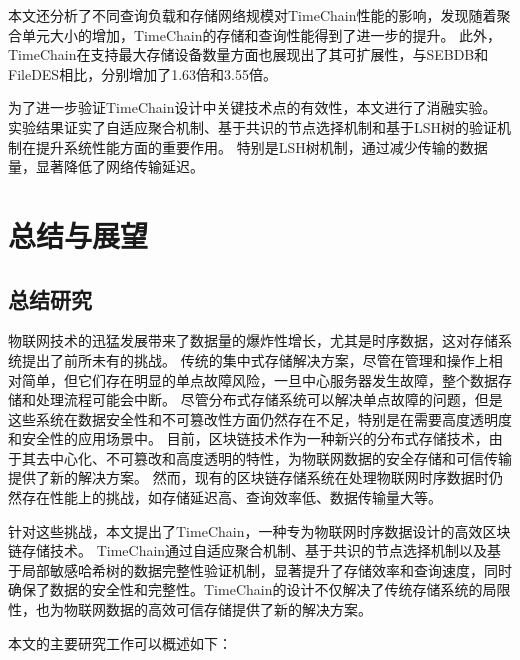 本文还分析了不同查询负载和存储网络规模对TimeChain性能的影响，发现随着聚合单元大小的增加，TimeChain的存储和查询性能得到了进一步的提升。
此外，TimeChain在支持最大存储设备数量方面也展现出了其可扩展性，与SEBDB和FileDES相比，分别增加了1.63倍和3.55倍。

为了进一步验证TimeChain设计中关键技术点的有效性，本文进行了消融实验。
实验结果证实了自适应聚合机制、基于共识的节点选择机制和基于LSH树的验证机制在提升系统性能方面的重要作用。
特别是LSH树机制，通过减少传输的数据量，显著降低了网络传输延迟。

\chapter{总结与展望}
\section{总结研究}
物联网技术的迅猛发展带来了数据量的爆炸性增长，尤其是时序数据，这对存储系统提出了前所未有的挑战。
传统的集中式存储解决方案，尽管在管理和操作上相对简单，但它们存在明显的单点故障风险，一旦中心服务器发生故障，整个数据存储和处理流程可能会中断。
尽管分布式存储系统可以解决单点故障的问题，但是这些系统在数据安全性和不可篡改性方面仍然存在不足，特别是在需要高度透明度和安全性的应用场景中。
目前，区块链技术作为一种新兴的分布式存储技术，由于其去中心化、不可篡改和高度透明的特性，为物联网数据的安全存储和可信传输提供了新的解决方案。
然而，现有的区块链存储系统在处理物联网时序数据时仍然存在性能上的挑战，如存储延迟高、查询效率低、数据传输量大等。

针对这些挑战，本文提出了TimeChain，一种专为物联网时序数据设计的高效区块链存储技术。
TimeChain通过自适应聚合机制、基于共识的节点选择机制以及基于局部敏感哈希树的数据完整性验证机制，显著提升了存储效率和查询速度，同时确保了数据的安全性和完整性。TimeChain的设计不仅解决了传统存储系统的局限性，也为物联网数据的高效可信存储提供了新的解决方案。

本文的主要研究工作可以概述如下：

